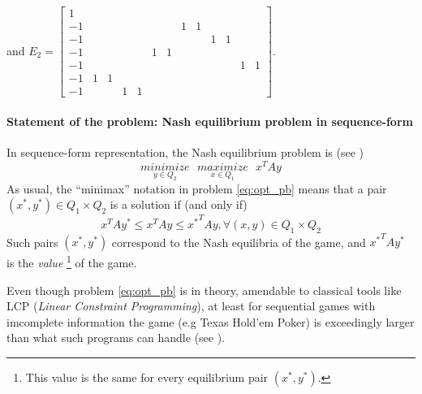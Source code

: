 \documentclass{article} %
\begin{document}
and $E_2 = \left[\begin{array}{ccccccccccccc}
1 &   &   &   &   &   &   &   &   &   &   &   &  \\
-1 &   &   &   &   &   &   & 1 & 1 &   &   &   &  \\
-1 &   &   &   &   &   &   &   &   & 1 & 1 &   &  \\
-1 &   &   &   &   & 1 & 1 &   &   &   &   &   &  \\
-1 &   &   &   &   &   &   &   &   &   &   & 1 & 1\\
-1 & 1 & 1 &   &   &   &   &   &   &   &   &   &  \\
-1 &   &   & 1 & 1 &   &   &   &   &   &   &   &  
\end{array}\right]$.\\


\paragraph{Statement of the problem: Nash equilibrium problem in sequence-form}
In sequence-form representation, the Nash equilibrium problem is (see \cite{von1996efficient})
\begin{equation}
  \underset{y \in Q_2}{minimize}\text{ }\underset{x \in Q_1}{maximize}\text{ }{x^TAy}
  \label{eq:opt_pb}
\end{equation}
As usual, the ``minimax'' notation in problem \eqref{eq:opt_pb} means that a pair $(x^*, y^*) \in Q_1 \times Q_2$ is a solution if (and only if)
\begin{equation}
  x^TAy^* \le x^TAy \le {x^*}^TAy, \forall (x, y) \in Q_1 \times Q_2
\end{equation}
Such pairs $(x^*, y^*)$ correspond to the Nash equilibria of the game, and ${x^*}^TAy^*$ is the \textit{value}
\footnote{This value is the same for every equilibrium pair $(x^*, y^*)$.} of the game.
  
Even though problem \eqref{eq:opt_pb} is in theory, amendable to classical tools like LCP (\textit{Linear Constraint Programming}), at least for sequential games with imcomplete information the game (e.g Texas Hold'em Poker) is exceedingly larger than what such programs can handle (see \cite{hoda2010smoothing}).
\end{document}
